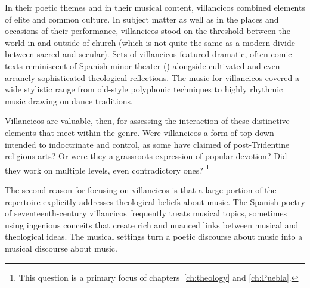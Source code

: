 In their poetic themes and in their musical content, villancicos combined elements of elite and common culture.
In subject matter as well as in the places and occasions of their performance, villancicos stood on the threshold between the world in and outside of church (which is not quite the same as a modern divide between sacred and secular).
Sets of villancicos featured dramatic, often comic texts reminiscent of Spanish minor theater () alongside cultivated and even arcanely sophisticated theological reflections.
The music for villancicos covered a wide stylistic range from old-style polyphonic techniques to highly rhythmic music drawing on dance traditions.

Villancicos are valuable, then, for assessing the interaction of these distinctive elements that meet within the genre.
Were villancicos a form of top-down  intended to indoctrinate and control, as some have claimed of post-Tridentine religious arts?
Or were they a grassroots expression of popular devotion?
Did they work on multiple levels, even contradictory ones?%
	\footnote{%
	This question is a primary focus of chapters~\ref{ch:theology} and \ref{ch:Puebla}.
	}

The second reason for focusing on villancicos is that a large portion of the repertoire explicitly addresses theological beliefs about music.
The Spanish poetry of seventeenth-century villancicos frequently treats musical topics, sometimes using ingenious conceits that create rich and nuanced links between musical and theological ideas.
The musical settings turn a poetic discourse about music into a musical discourse about music.

